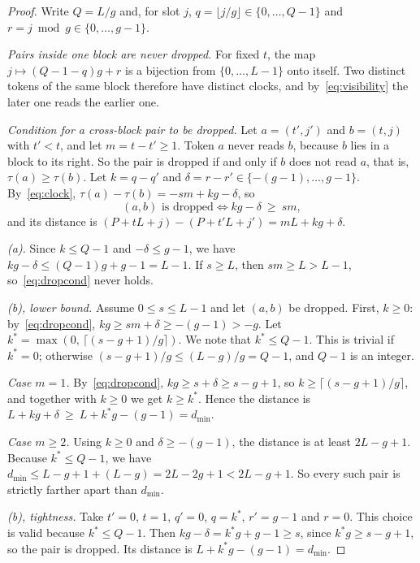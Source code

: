 \documentclass[11pt]{article}
\theoremstyle{definition}
\theoremstyle{remark}
\newcommand{\dmin}{d_{\min}}
\newcommand{\pos}[1]{\max\!\left(0,\,#1\right)}
\begin{document}
\begin{proof}
Write $Q=L/g$ and, for slot $j$, $q=\lfloor j/g\rfloor\in\{0,\dots,Q-1\}$ and $r=j\bmod g\in\{0,\dots,g-1\}$.

\emph{Pairs inside one block are never dropped.}
For fixed $t$, the map $j\mapsto(Q-1-q)g+r$ is a bijection from $\{0,\dots,L-1\}$ onto itself.
Two distinct tokens of the same block therefore have distinct clocks, and by~\eqref{eq:visibility} the later one reads the earlier one.

\emph{Condition for a cross-block pair to be dropped.}
Let $a=(t',j')$ and $b=(t,j)$ with $t'<t$, and let $m=t-t'\ge1$.
Token $a$ never reads $b$, because $b$ lies in a block to its right.
So the pair is dropped if and only if $b$ does not read $a$, that is, $\tau(a)\ge\tau(b)$.
Let $k=q-q'$ and $\delta=r-r'\in\{-(g-1),\dots,g-1\}$.
By~\eqref{eq:clock}, $\tau(a)-\tau(b)=-sm+kg-\delta$, so
\begin{equation}
  \text{$(a,b)$ is dropped} \iff kg-\delta\ \ge\ sm,
  \label{eq:dropcond}
\end{equation}
and its distance is $(P+tL+j)-(P+t'L+j') = mL+kg+\delta$.

\emph{(a).}
Since $k\le Q-1$ and $-\delta\le g-1$, we have $kg-\delta\le (Q-1)g+g-1=L-1$.
If $s\ge L$, then $sm\ge L>L-1$, so~\eqref{eq:dropcond} never holds.

\emph{(b), lower bound.}
Assume $0\le s\le L-1$ and let $(a,b)$ be dropped.
First, $k\ge0$: by~\eqref{eq:dropcond}, $kg\ge sm+\delta\ge-(g-1)>-g$.
Let $k^\ast=\pos{\lceil (s-g+1)/g\rceil}$.
We note that $k^\ast\le Q-1$.
This is trivial if $k^\ast=0$; otherwise $(s-g+1)/g\le (L-g)/g=Q-1$, and $Q-1$ is an integer.

\emph{Case $m=1$.}
By~\eqref{eq:dropcond}, $kg\ge s+\delta\ge s-g+1$, so $k\ge\lceil (s-g+1)/g\rceil$, and together with $k\ge0$ we get $k\ge k^\ast$.
Hence the distance is $L+kg+\delta\ \ge\ L+k^\ast g-(g-1)=\dmin$.

\emph{Case $m\ge2$.}
Using $k\ge0$ and $\delta\ge-(g-1)$, the distance is at least $2L-g+1$.
Because $k^\ast\le Q-1$, we have $\dmin\le L-g+1+(L-g)=2L-2g+1<2L-g+1$.
So every such pair is strictly farther apart than $\dmin$.

\emph{(b), tightness.}
Take $t'=0$, $t=1$, $q'=0$, $q=k^\ast$, $r'=g-1$ and $r=0$.
This choice is valid because $k^\ast\le Q-1$.
Then $kg-\delta=k^\ast g+g-1\ge s$, since $k^\ast g\ge s-g+1$, so the pair is dropped.
Its distance is $L+k^\ast g-(g-1)=\dmin$.
\end{proof}
\end{document}
